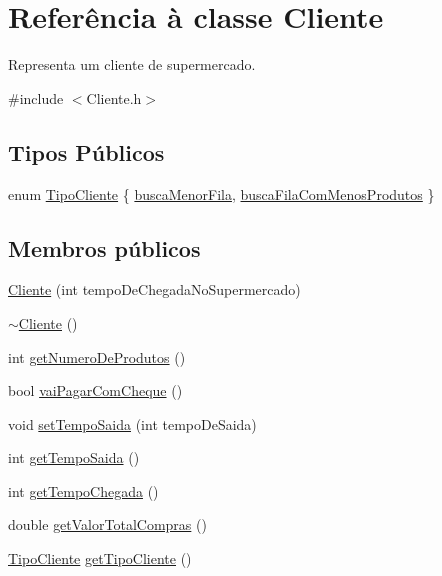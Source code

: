 \hypertarget{class_cliente}{\section{Referência à classe Cliente}
\label{class_cliente}
}


Representa um cliente de supermercado.  




{\ttfamily \#include $<$Cliente.\+h$>$}

\subsection*{Tipos Públicos}
\begin{DoxyCompactItemize}
\item 
enum \hyperlink{class_cliente_a8a3be2b4ce63f1f0c04d6ae5a71db657}{Tipo\+Cliente} \{ \hyperlink{class_cliente_a8a3be2b4ce63f1f0c04d6ae5a71db657aaf1391199882e9e29292e6b7b2ff2b91}{busca\+Menor\+Fila}, 
\hyperlink{class_cliente_a8a3be2b4ce63f1f0c04d6ae5a71db657a0e7a8fbf97e475f4fb92a09650c933e0}{busca\+Fila\+Com\+Menos\+Produtos}
 \}
\end{DoxyCompactItemize}
\subsection*{Membros públicos}
\begin{DoxyCompactItemize}
\item 
\hyperlink{class_cliente_a6625b6a833a0e8b2f7959bc5344eb0be}{Cliente} (int tempo\+De\+Chegada\+No\+Supermercado)
\item 
\hyperlink{class_cliente_a29d1d53394350c66363109e33c990b58}{$\sim$\+Cliente} ()
\item 
int \hyperlink{class_cliente_a756b8f00c253d491b8a4cabaa3c1540b}{get\+Numero\+De\+Produtos} ()
\item 
bool \hyperlink{class_cliente_ac2d3ce2f3bd1871c050ed882465d77aa}{vai\+Pagar\+Com\+Cheque} ()
\item 
void \hyperlink{class_cliente_a5a7d3685690926672a511a169e47e19e}{set\+Tempo\+Saida} (int tempo\+De\+Saida)
\item 
int \hyperlink{class_cliente_a43682e1d4ace198e91aa7072955a0fe0}{get\+Tempo\+Saida} ()
\item 
int \hyperlink{class_cliente_a00cb6606f92e0a5e74d95ce86c66b367}{get\+Tempo\+Chegada} ()
\item 
double \hyperlink{class_cliente_a90c7cecbe137527735fb4a90008ad0d3}{get\+Valor\+Total\+Compras} ()
\item 
\hyperlink{class_cliente_a8a3be2b4ce63f1f0c04d6ae5a71db657}{Tipo\+Cliente} \hyperlink{class_cliente_abab02599bfed5285df6fd043acec0b5b}{get\+Tipo\+Cliente} ()
\end{DoxyCompactItemize}


